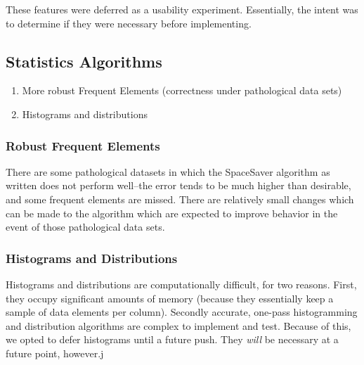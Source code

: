 These features were deferred as a usability experiment. Essentially, the intent was to determine if they were necessary before implementing. 

\subsection{Statistics Algorithms}
\begin{enumerate}
\item More robust Frequent Elements (correctness under pathological data sets)
\item Histograms and distributions
\end{enumerate}

\subsubsection{Robust Frequent Elements}
There are some pathological datasets in which the SpaceSaver algorithm as written does not perform well--the error tends to be much higher than desirable, and some frequent elements are missed. There are relatively small changes which can be made to the algorithm which are expected to improve behavior in the event of those pathological data sets.

\subsubsection{Histograms and Distributions}
Histograms and distributions are computationally difficult, for two reasons. First, they occupy significant amounts of memory (because they essentially keep a sample of data elements per column). Secondly accurate, one-pass histogramming and distribution algorithms are complex to implement and test. Because of this, we opted to defer histograms until a future push. They \emph{will} be necessary at a future point, however.j

